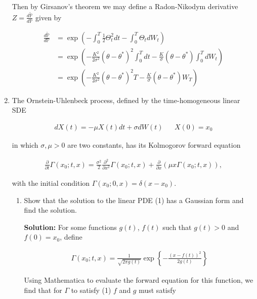 \documentclass[12pt, a4paper]{article}
\begin{document}
\begin{enumerate}
    Then by Girsanov's theorem we may define a Radon-Nikodym derivative $Z= \frac{d\tilde{\mathbb P}}{d \mathbb P}$ given by

    \begin{align*}
        \frac{d\tilde{\mathbb P}}{d \mathbb P} &= \exp \left(- \int_0^T \frac{1}{2} \Theta_t^2 dt - \int_0^T \Theta_t dW_t \right)\\ 
        &= \exp \left( - \frac{K^2}{2 \sigma^2}(\theta-\theta^*)^2 \int_0^T dt - \frac{K}{\sigma} (\theta-\theta^*) \int_0^T dW_t \right)\\
        &= \exp \left( - \frac{K^2}{2 \sigma^2}(\theta-\theta^*)^2 T - \frac{K}{\sigma} (\theta-\theta^*) W_T \right)
    \end{align*}

    \item The Ornstein-Uhlenbeck process, defined by the time-homogeneous linear SDE 
    
    \begin{align*}
        dX(t) = -\mu X(t)dt + \sigma dW(t) && X(0)=x_0
    \end{align*}

    in which $\sigma, \mu >0$ are two constants, has its Kolmogorov forward equation 

    \begin{align}
        \frac{\partial}{\partial t} \Gamma(x_0;t,x) = \frac{\sigma^2}{2} \frac{\partial^2}{\partial x^2} \Gamma(x_0; t,x) + \frac{\partial}{\partial x} \left( \mu x \Gamma(x_0; t,x) \right),
    \end{align}

    with the initial condition $\Gamma(x_0; 0,x) = \delta(x-x_0)$. 

    \begin{enumerate}
        \item Show that the solution to the linear PDE (1) has a Gaussian form and find the solution.

        \textbf{Solution:} For some functions $g(t)$, $f(t)$ such that $g(t) > 0$ and $f(0)=x_0$, define 

        \begin{align*}
            \Gamma(x_0;t,x)=  \frac{1}{\sqrt{2 \pi g(t)}} \exp \left\{-\frac{(x-f(t))^2}{2 g(t)}\right\}
        \end{align*}

        Using Mathematica to evaluate the forward equation for this function, we find that for $\Gamma$ to satisfy (1) $f$ and $g$ must satisfy


\end{enumerate}
\end{enumerate}
\end{document}
